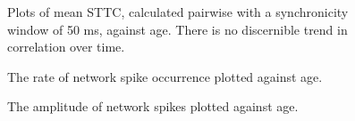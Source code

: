 \documentclass{bmcart}
\begin{document}
\begin{backmatter}
\begin{figure}[h!]
	\caption{Plots of mean STTC, calculated pairwise with a synchronicity window of 50 ms, against age. There is no discernible trend in correlation over time.}
	\label{fig:correlation}
\end{figure}

\begin{figure}[h!]
	\caption{The rate of network spike occurrence plotted against age.}
	\label{fig:networkfreq}
\end{figure}

\begin{figure}[h!]
	\caption{The amplitude of network spikes plotted against age.}
	\label{fig:networkamp}
\end{figure}

\end{backmatter}
\end{document}
